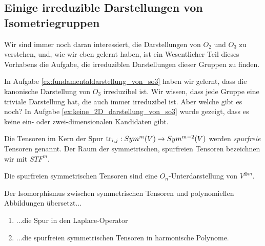\subsection{Einige irreduzible Darstellungen von Isometriegruppen}

\begin{remark}
Wir sind immer noch daran interessiert, die Darstellungen von $O_2$ und $O_3$ zu verstehen, und, wie wir eben gelernt haben, ist ein Wesentlicher Teil dieses Vorhabens die Aufgabe, die irreduziblen Darstellungen dieser Gruppen zu finden.

In Aufgabe \ref{ex:fundamentaldarstellung_von_so3} haben wir gelernt, dass die kanonische Darstellung von $O_3$ irreduzibel ist. Wir wissen, dass jede Gruppe eine triviale Darstellung hat, die auch immer irreduzibel ist. Aber welche gibt es noch? In Aufgabe \ref{ex:keine_2D_darstellung_von_so3} wurde gezeigt, dass es keine ein- oder zwei-dimensionalen Kandidaten gibt.
\end{remark}

\begin{definition}
Die Tensoren im Kern der Spur $\operatorname{tr}_{i,j} : Sym^m(V) \to Sym^{m-2}(V)$ werden \emph{spurfreie} Tensoren genannt. Der Raum der symmetrischen, spurfreien Tensoren bezeichnen wir mit $STF^m$.
\end{definition}

\begin{lemma}
Die spurfreien symmetrischen Tensoren sind eine $O_n$-Unterdarstellung von $V^{\otimes m}$.
\end{lemma}

\begin{lemma}
Der Isomorphismus zwischen symmetrischen Tensoren und polynomiellen Abbildungen übersetzt...
\begin{enumerate}
\item ...die Spur in den Laplace-Operator
\item ...die spurfreien symmetrischen Tensoren in harmonische Polynome.
\end{enumerate}
\end{lemma}



